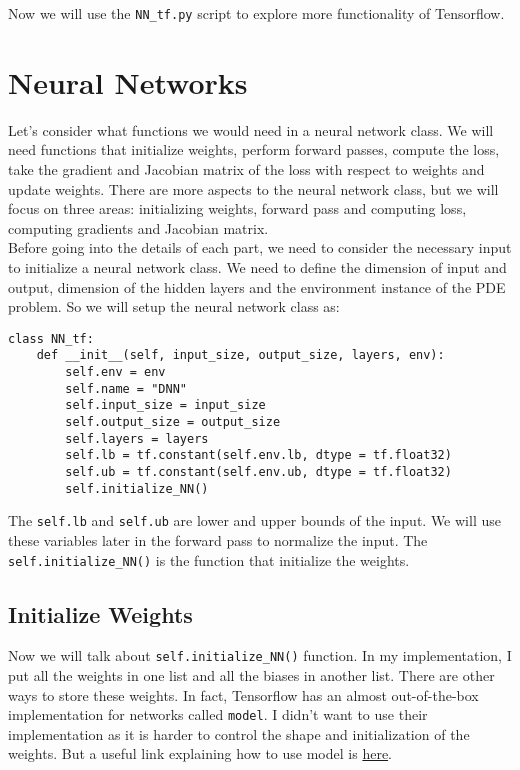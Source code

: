 \documentclass{article}
\begin{document}
Now we will use the \texttt{NN\_tf.py} script to explore more functionality of Tensorflow. 

\section{Neural Networks}
Let's consider what functions we would need in a neural network class. We will need functions that initialize weights, perform forward passes, compute the loss, take the gradient and Jacobian matrix of the loss with respect to weights and update weights. There are more aspects to the neural network class, but we will focus on three areas: initializing weights, forward pass and computing loss, computing gradients and Jacobian matrix. \\

Before going into the details of each part, we need to consider the necessary input to initialize a neural network class. We need to define the dimension of input and output, dimension of the hidden layers and the environment instance of the PDE problem. So we will setup the neural network class as:
\begin{lstlisting}
class NN_tf:
	def __init__(self, input_size, output_size, layers, env):
		self.env = env
		self.name = "DNN"
		self.input_size = input_size
		self.output_size = output_size
		self.layers = layers
		self.lb = tf.constant(self.env.lb, dtype = tf.float32)
		self.ub = tf.constant(self.env.ub, dtype = tf.float32)
		self.initialize_NN()
\end{lstlisting}

The \texttt{self.lb} and \texttt{self.ub} are lower and upper bounds of the input. We will use these variables later in the forward pass to normalize the input. The \texttt{self.initialize\_NN()} is the function that initialize the weights. 

\subsection{Initialize Weights}
Now we will talk about \texttt{self.initialize\_NN()} function. In my implementation, I put all the weights in one list and all the biases in another list. There are other ways to store these weights. In fact, Tensorflow has an almost out-of-the-box implementation for networks called \texttt{model}. I didn't want to use their implementation as it is harder to control the shape and initialization of the weights. But a useful link explaining how to use model is \href{https://www.tensorflow.org/tutorials/customization/custom_layers}{here}. \\
\end{document}
